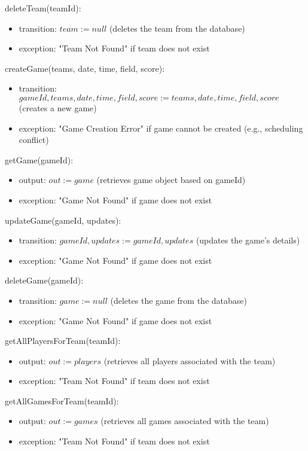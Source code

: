 \documentclass[12pt, titlepage]{article}
\begin{document}
\noindent deleteTeam(teamId):
\begin{itemize}
  \item transition: $team := null$ (deletes the team from the database)
  \item exception: "Team Not Found" if team does not exist
\end{itemize}

\noindent createGame(teams, date, time, field, score):
\begin{itemize}
  \item transition: $gameId, teams, date, time, field, score := teams, date, time, field, score$ (creates a new game)
  \item exception: "Game Creation Error" if game cannot be created (e.g., scheduling conflict)
\end{itemize}

\noindent getGame(gameId):
\begin{itemize}
  \item output: $out := game$ (retrieves game object based on gameId)
  \item exception: "Game Not Found" if game does not exist
\end{itemize}

\noindent updateGame(gameId, updates):
\begin{itemize}
  \item transition: $gameId, updates := gameId, updates$ (updates the game's details)
  \item exception: "Game Not Found" if game does not exist
\end{itemize}

\noindent deleteGame(gameId):
\begin{itemize}
  \item transition: $game := null$ (deletes the game from the database)
  \item exception: "Game Not Found" if game does not exist
\end{itemize}

\noindent getAllPlayersForTeam(teamId):
\begin{itemize}
  \item output: $out := players$ (retrieves all players associated with the team)
  \item exception: "Team Not Found" if team does not exist
\end{itemize}

\noindent getAllGamesForTeam(teamId):
\begin{itemize}
  \item output: $out := games$ (retrieves all games associated with the team)
  \item exception: "Team Not Found" if team does not exist
\end{itemize}
\end{document}
